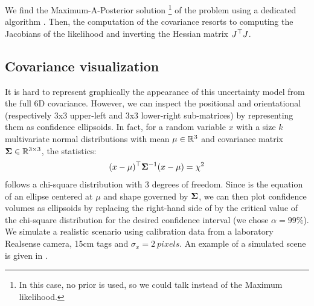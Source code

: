 We find the Maximum-A-Posterior solution \footnote{In this case, no prior is used, so we could talk instead of the Maximum likelihood.} of the problem using a dedicated algorithm \cite{collins2014infinitesimal}.
Then, the computation of the covariance resorts to computing the Jacobians of the likelihood and inverting the Hessian matrix $J^{\top} J$. 

\subsection{Covariance visualization}

It is hard to represent graphically the appearance of this uncertainty model from the full 6D covariance. However, we can inspect the positional and orientational
(respectively 3x3 upper-left and 3x3 lower-right sub-matrices) by representing them as confidence ellipsoids.
In fact, for a random variable $x$ with a size $k$ multivariate normal distributions with mean $\mu \in \mathbb{R}^3$ and 
covariance matrix ${\bm \Sigma} \in \mathbb{R}^{3 \times 3}$, the statistics:
%
\begin{equation}
    (x - \mu)^{\top} {\bm \Sigma}^{-1}(x - \mu) = \chi^2
    \label{eq:chi2}
\end{equation}
%
follows a chi-square distribution with 3 degrees of freedom. Since  is the equation of an ellipse centered at $\mu$ and shape governed by ${\bm \Sigma}$, we can then plot confidence volumes as ellipsoids by replacing the right-hand side of  
 by the critical value of the chi-square distribution for the desired confidence interval (we chose $\alpha=99\%$). We simulate a 
realistic scenario using calibration data from a laboratory Realsense camera, 15cm tags and $\sigma_x = 2~pixels$. An example of a simulated scene is given
in . 

